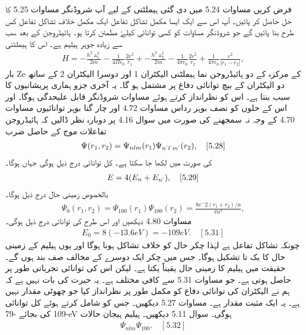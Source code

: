 فرض کریں مساوات 5.24 میں دی گئی ہیملٹنی کے لیے آپ شروڈنگر مساوات 5.25 کا حل  حاصل کر پائیں۔ آپ اس سے ایک ایسا مکمل تشاکل تفاعل ایک مکمل خلاف تشاکل تفاعل کس طرح بنا پائیں گے جو شروڈنگر مساوات کو کسی توانائی کیلۓ مطمئن کرتا ہو۔
ہائیڈروجن کے بعد سب سے زیادہ جوہر ہیلیم  ہے۔ اس کا ہیملٹنی
\begin{align}
H= { -\frac{h^2 \vartriangle^2 _{1}}{2m} -\frac{1}{4\Pi\epsilon_{0}} \frac{2e^2}{r_{1}}} + { -\frac{h^2 \vartriangle^2 _{2}}{2m}-\frac{1}{4 \pi \epsilon_{0}} \frac{2e^2}{r_{2}}}+ \frac{1}{4 \pi \epsilon_{0}}\frac{e^2}{|r_{1} -r_{2}|},
\end{align}
بار Ze کے مرکزہ کے دو ہائیڈروجن نما ہیملٹنی الیکٹران 1 اور دوسرا الیکٹران 2 کے ساتھ دو الیکٹران کے بیچ توانائی دفاع پر مشتمل ہو گا۔ یہ آخری جزو ہماری پریشانیوں کا سبب بنتا ہے۔ اس کو نظرانداز کرتے ہوئے مساوات شروڈنگر قابل علیحدگی ہوگا۔ اور اس کے حلوں کو نصف بوہر رداس مساوات 4.72 اور چار گنا بوہر توانائیوں مساوات 4.70 کے وجہ نہ سمجھنے کی صورت میں سوال 4.16 پر دوبارہ نظر ڈالیں کہ ہائیڈروجن تفاعلات موج کے حاصل ضرب 
\begin{align}
 \Psi(r_{1}, r_{2})= \Psi_{nlm} (r_{1}) \Psi_{n^{`} l^{`} m^{`}} (r_{2}), \quad [5.28] \end{align}
کی صورت میں لکھا جا سکتا ہے۔ کل توانائی درج ذیل ہوگی جہاں  ہوگا۔
\begin{align}
 E= 4(E_{n} +E_{n^{`}}), \quad [5.29] \end{align}
بالخصوص زمینی حال درج ذیل ہوگا۔
\begin{align}
\Psi_{0}(r_{1}, r_{2})=\Psi_{100}(r_{1}) \Psi_{100}(r_{2})=\frac{8e^-2(r_{1} + r_{2})/a}{\pi a^3},
\end{align}
مساوات 4.80 دیکھیں اور اس طرح کی توانائی درج ذیل ہوگی۔
\begin{align}
 E_{0}=8(-13.6eV)=-109 eV . \quad [5.31] \end{align}
چونکہ  تشاکل تفاعل ہے لہٰذا چکر حال کو خلاف تشاکل ہونا ہوگا اور یوں ہیلیم کے زمینی حال کا  یک تا تشکیل  ہوگا۔ جس میں چکر ایک دوسرے کے مخالف صف بند ہوں گے۔ حقیقت میں ہیلیم کا زمینی حال یقیناً یکتا ہے۔ لیکن اس کی توانائی تجرباتی طور پر  حاصل ہوتی ہے۔ جو مساوات 5.31 سے کافی مختلف ہے۔ یہ حیرت کی بات نہیں ہے کہ ہم نے الیکٹران کی توانائی دفاع کو مکمل طور پر نظرانداز کیا جو چھوٹی مقدار نہیں ہے۔ یہ ایک مثبت مقدار ہے۔ مساوات 5.27 دیکھیں۔ جس کو شامل کرتے ہوئے کل توانائی  -109 کی بجائے -79eV ہوگی۔ سوال 5.11 دیکھیں۔ ہیلیم ہیجان حالات 
\begin{align}
 \Psi_{nlm} \Psi_{100} . \quad [5.32] \end{align}
